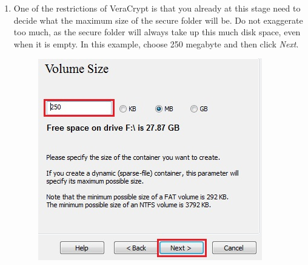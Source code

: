 \documentclass{tufte-handout}
\begin{document}
\begin{enumerate}
	\newpage
	
	\item One of the restrictions of VeraCrypt is that you already at this stage need to decide what the maximum size of the secure folder will be. Do not exaggerate too much, as the secure folder will always take up this much disk space, even when it is empty. In this example, choose 250 megabyte and then click \textit{Next}.
	\begin{figure}%
		\includegraphics[width=.7\linewidth]{img/vc_install_7.png}
	\end{figure}
	\FloatBarrier
	

\end{enumerate}
\end{document}
